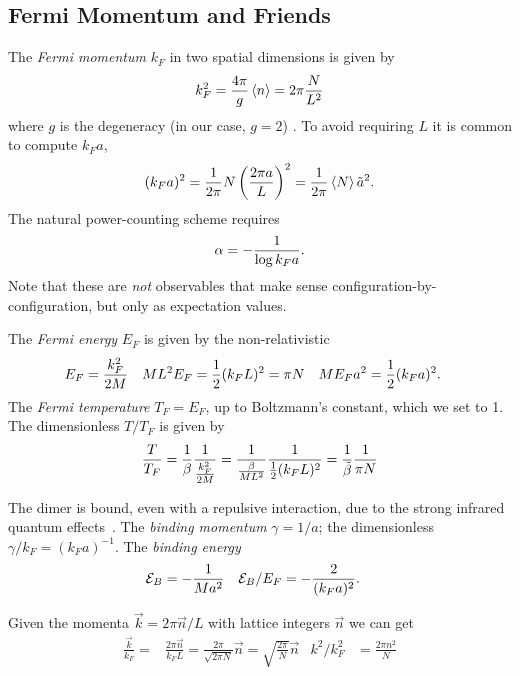 \subsection{Fermi Momentum and Friends}\label{sec:kF}

The \emph{Fermi momentum} $k_F$ in two spatial dimensions is given by
\begin{align}
    k_F^2 = \frac{4\pi}{g} \left\langle n \right\rangle = 2\pi \frac{N}{L^2}
    \label{eq:kF}
\end{align}
where $g$ is the degeneracy (in our case, $g=2$) \cite{Beane:2022wcn}.
To avoid requiring $L$ it is common to compute $k_F a$,
\begin{align}
    (k_F a)^2 = \frac{1}{2\pi} N \left(\frac{2\pi a}{L}\right)^2 = \frac{1}{2\pi} \left\langle N \right\rangle \tilde{a}^2.
    \label{eq:kF a}
\end{align}
The natural power-counting scheme requires\cite{Beane:2022wcn}
\begin{align}
    \alpha = - \frac{1}{\log k_F a}.
    \label{eq:alpha}
\end{align}
Note that these are \emph{not} observables that make sense configuration-by-configuration, but only as expectation values.

The \emph{Fermi energy} $E_F$ is given by the non-relativistic
\begin{align}
    E_F &= \frac{k_F^2}{2M}
    &
    ML^2 E_F &= \frac{1}{2} (k_F L)^2 = \pi N
    &
    ME_F a^2 &= \frac{1}{2} (k_F a)^2.
\end{align}
The \emph{Fermi temperature} $T_F=E_F$, up to Boltzmann's constant, which we set to 1.
The dimensionless $T/T_F$ is given by
\begin{align}
    \frac{T}{T_F} = \frac{1}{\beta}\frac{1}{\frac{k_F^2}{2M}} = \frac{1}{\frac{\beta}{ML^2}} \frac{1}{\frac{1}{2} (k_F L)^2} = \frac{1}{\tilde{\beta}} \frac{1}{\pi N}
    \label{eq:TF}
\end{align}

The dimer is bound, even with a repulsive interaction, due to the strong infrared quantum effects~\cite{Beane:2022wcn}.
The \emph{binding momentum} $\gamma=1/a$; the dimensionless $\gamma/k_F = (k_F a)^{-1}$.
The \emph{binding energy} \binding
\begin{align}
    \mathcal{E}_B &= - \frac{1}{Ma^2}
    &
    \mathcal{E}_B / E_F &= - \frac{2}{(k_F a)^2}.
    \label{eq:binding energy}
\end{align}

Given the momenta $\vec{k} = 2\pi \vec{n}/L$ with lattice integers $\vec{n}$ we can get
\begin{align}
    \frac{\vec{k}}{k_F}
    =& \frac{2\pi \vec{n}}{k_F L}
    = \frac{2\pi}{\sqrt{2\pi N}} \vec{n} = \sqrt{\frac{2\pi}{N}} \vec{n}
    &
    k^2/k_F^2 &= \frac{2\pi n^2}{N}
\end{align}
